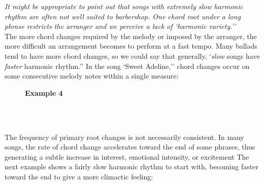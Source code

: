 \documentclass{article} %
\numberwithin{equation}{section} %
\begin{document}
		\textit{It might be appropriate to point out that songs with extremely slow harmonic rhythm are often not well suited to barbershop. One chord root under a long phrase restricts the arranger and we perceive a lack of `harmonic variety.''} \\

		The more chord changes required by the melody or imposed by the arranger, the more difficult an arrangement becomes to perform at a fast tempo. Many ballads tend to have more cbord changes, so we could say that generally, `\textit{slow} songs have \textit{faster} harmonic rhythm.'' In the song `Sweet Adeline,'' chord changes occur on some consecutive melody notes within a single measure: \\

		\begin{figure}[H]
		\textbf{Example 4}
		
		\\

		\\
		\end{figure}

		The frequency of primary root changes is not necessarily consistent. In many songs, the rate of chord change accelerates toward the end of some phrases, thus generating a subtle increase in interest, emotional intensity, or excitement The next example shows a fairly slow harmonic rhythm to start with, becoming faster toward the end to give a more climactic feeling: \\
\end{document}
